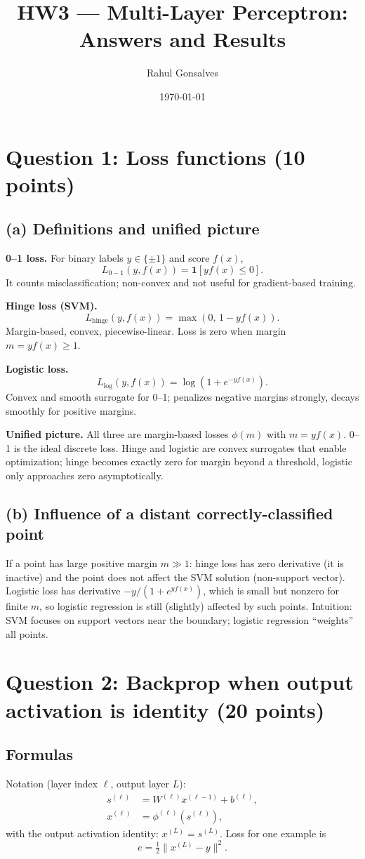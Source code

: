\documentclass[12pt]{article}
\title{HW3 --- Multi-Layer Perceptron: Answers and Results}
\author{Rahul Gonsalves}
\date{\today}
\begin{document}
\maketitle

\section*{Question 1: Loss functions (10 points)}
\subsection*{(a) Definitions and unified picture}
\textbf{0--1 loss.} For binary labels $y\in\{\pm1\}$ and score $f(x)$,
\[ L_{0-1}(y,f(x)) = \mathbf{1}[y f(x) \le 0]. \]
It counts misclassification; non-convex and not useful for gradient-based training.

\textbf{Hinge loss (SVM).}
\[ L_{\text{hinge}}(y,f(x)) = \max(0,\,1 - y f(x)). \]
Margin-based, convex, piecewise-linear. Loss is zero when margin $m=y f(x)\ge1$.

\textbf{Logistic loss.}
\[ L_{\text{log}}(y,f(x)) = \log(1 + e^{-y f(x)}). \]
Convex and smooth surrogate for 0--1; penalizes negative margins strongly, decays smoothly for positive margins.

\textbf{Unified picture.} All three are margin-based losses $\phi(m)$ with $m=yf(x)$. 0--1 is the ideal discrete loss. Hinge and logistic are convex surrogates that enable optimization; hinge becomes exactly zero for margin beyond a threshold, logistic only approaches zero asymptotically.

\subsection*{(b) Influence of a distant correctly-classified point}
If a point has large positive margin $m\gg1$: hinge loss has zero derivative (it is inactive) and the point does not affect the SVM solution (non-support vector). Logistic loss has derivative $-y/(1+e^{y f(x)})$, which is small but nonzero for finite $m$, so logistic regression is still (slightly) affected by such points. Intuition: SVM focuses on support vectors near the boundary; logistic regression ``weights'' all points.

\section*{Question 2: Backprop when output activation is identity (20 points)}
\subsection*{Formulas}
Notation (layer index $\ell$, output layer $L$):
\begin{align*}
s^{(\ell)} &= W^{(\ell)} x^{(\ell-1)} + b^{(\ell)},\\
x^{(\ell)} &= \phi^{(\ell)}(s^{(\ell)}),
\end{align*}
with the output activation identity: $x^{(L)} = s^{(L)}$. Loss for one example is
\[ e = \tfrac{1}{2} \|x^{(L)} - y\|^2. \]
\end{document}
